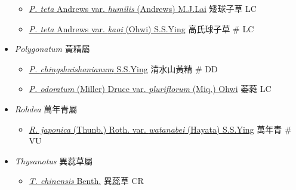 \begin{itemize}
  \begin{itemize}
        \item[] \href{http://www.theplantlist.org/tpl1.1/search?q=Peliosanthes+teta+var.+humilis}{\textit{P. teta} Andrews var. \textit{humilis} (Andrews) M.J.Lai}   矮球子草   LC
        \item[] \href{http://www.theplantlist.org/tpl1.1/search?q=Peliosanthes+teta+var.+kaoi}{\textit{P. teta} Andrews var. \textit{kaoi} (Ohwi) S.S.Ying}   高氏球子草  \# LC
  \end{itemize}
 \item[] \textit{Polygonatum} 黃精屬
                                
  \begin{itemize}
        \item[] \href{http://www.theplantlist.org/tpl1.1/search?q=Polygonatum+chingshuishanianum}{\textit{P. chingshuishanianum} S.S.Ying}   清水山黃精  \# DD
        \item[] \href{http://www.theplantlist.org/tpl1.1/search?q=Polygonatum+odoratum+var.+pluriflorum}{\textit{P. odoratum} (Miller) Druce var. \textit{pluriflorum} (Miq.) Ohwi}   萎蕤   LC
  \end{itemize}
 \item[] \textit{Rohdea} 萬年青屬
                                
  \begin{itemize}
        \item[] \href{http://www.theplantlist.org/tpl1.1/search?q=Rohdea+japonica+var.+watanabei}{\textit{R. japonica} (Thunb.) Roth. var. \textit{watanabei} (Hayata) S.S.Ying}   萬年青  \# VU
  \end{itemize}
 \item[] \textit{Thysanotus} 異蕊草屬
                                
  \begin{itemize}
        \item[] \href{http://www.theplantlist.org/tpl1.1/search?q=Thysanotus+chinensis}{\textit{T. chinensis} Benth.}   異蕊草   CR
  \end{itemize}
  \end{itemize}
